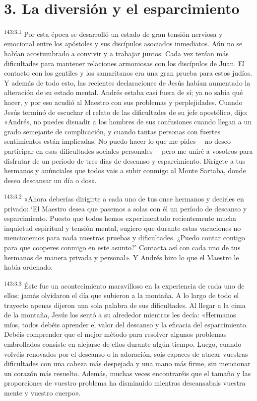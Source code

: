 \section*{3. La diversión y el esparcimiento}
\par
\textsuperscript{143:3.1} Por esta época se desarrolló un estado de gran tensión nerviosa y emocional entre los apóstoles y sus discípulos asociados inmediatos. Aún no se habían acostumbrado a convivir y a trabajar juntos. Cada vez tenían más dificultades para mantener relaciones armoniosas con los discípulos de Juan. El contacto con los gentiles y los samaritanos era una gran prueba para estos judíos. Y además de todo esto, las recientes declaraciones de Jesús habían aumentado la alteración de su estado mental. Andrés estaba casi fuera de sí; ya no sabía qué hacer, y por eso acudió al Maestro con sus problemas y perplejidades. Cuando Jesús terminó de escuchar el relato de las dificultades de su jefe apostólico, dijo: «Andrés, no puedes disuadir a los hombres de sus confusiones cuando llegan a un grado semejante de complicación, y cuando tantas personas con fuertes sentimientos están implicadas. No puedo hacer lo que me pides ---no deseo participar en esas dificultades sociales personales--- pero me uniré a vosotros para disfrutar de un período de tres días de descanso y esparcimiento. Dirígete a tus hermanos y anúnciales que todos vais a subir conmigo al Monte Sartaba, donde deseo descansar un día o dos».

\par
\textsuperscript{143:3.2} «Ahora deberías dirigirte a cada uno de tus once hermanos y decirles en privado: `El Maestro desea que pasemos a solas con él un período de descanso y esparcimiento. Puesto que todos hemos experimentado recientemente mucha inquietud espiritual y tensión mental, sugiero que durante estas vacaciones no mencionemos para nada nuestras pruebas y dificultades. ¿Puedo contar contigo para que cooperes conmigo en este asunto?' Contacta así con cada uno de tus hermanos de manera privada y personal». Y Andrés hizo lo que el Maestro le había ordenado.

\par
\textsuperscript{143:3.3} Éste fue un acontecimiento maravilloso en la experiencia de cada uno de ellos; jamás olvidaron el día que subieron a la montaña. A lo largo de todo el trayecto apenas dijeron una sola palabra de sus dificultades. Al llegar a la cima de la montaña, Jesús los sentó a su alrededor mientras les decía: «Hermanos míos, todos debéis aprender el valor del descanso y la eficacia del esparcimiento. Debéis comprender que el mejor método para resolver algunos problemas embrollados consiste en alejarse de ellos durante algún tiempo. Luego, cuando volvéis renovados por el descanso o la adoración, sois capaces de atacar vuestras dificultades con una cabeza más despejada y una mano más firme, sin mencionar un corazón más resuelto. Además, muchas veces encontraréis que el tamaño y las proporciones de vuestro problema ha disminuido mientras descansabais vuestra mente y vuestro cuerpo».

